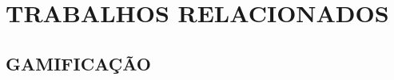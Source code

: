 \chapter{TRABALHOS RELACIONADOS}
\label{chap:trabalhos-relacionados}

\section{GAMIFICAÇÃO}
\label{sec:gamificacao}
